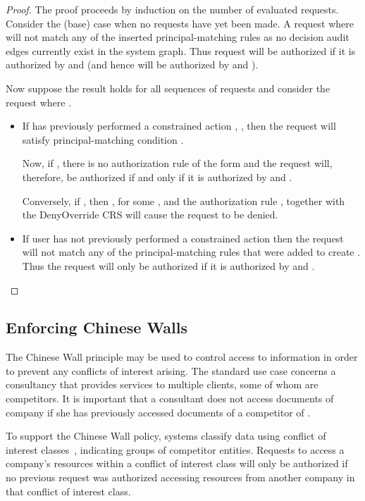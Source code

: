 \documentclass{article}
\begin{document}
\begin{proof}
    The proof proceeds by induction on the number of evaluated requests.
    Consider the (base) case when no requests have yet been made.
    A request  where  will not match any of the  inserted principal-matching rules as no decision audit edges currently exist in the system graph.
    Thus request  will be authorized if it is authorized by  and  (and hence will be authorized by  and ).

    Now suppose the result holds for all sequences of  requests and consider the request  where .\begin{itemize}
        \item If  has previously performed a constrained action , , then the request will satisfy principal-matching condition .
	
	      Now, if , there is no authorization rule of the form  and the request will, therefore, be authorized if and only if it is authorized by  and .
	
	      Conversely, if , then , for some , and the authorization rule , together with the \textsf{DenyOverride} CRS will cause the request to be denied.
        \item If user  has not previously performed a constrained action then the request will not match any of the principal-matching rules that were added to create .
	      Thus the request will only be authorized if it is authorized by  and .
\end{itemize}
\end{proof}
\subsection{Enforcing Chinese Walls}\label{sec:audit:chinesewall}
The Chinese Wall principle may be used to control access to information in order to prevent any conflicts of interest arising.
The standard use case concerns a consultancy that provides services to multiple clients, some of whom are competitors.
It is important that a consultant does not access documents of company  if she has previously accessed documents of a competitor of .

To support the Chinese Wall policy, systems classify data using conflict of interest classes~\cite{BrewerN89}, indicating groups of competitor entities.
Requests to access a company's resources within a conflict of interest class will only be authorized if no previous request was authorized accessing resources from another company in that conflict of interest class.
\end{document}
